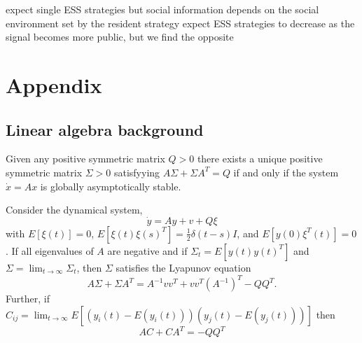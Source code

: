 \documentclass{article}
\begin{document}
expect single ESS strategies but social information depends on the social environment set by the resident strategy
expect ESS strategies to decrease as the signal becomes more public, but we find the opposite

\newpage
\section{Appendix}
\subsection{Linear algebra background }

\begin{theorem} \label{lyapeq_theorem}
Given any positive symmetric matrix $Q>0$ there exists a unique positive symmetric matrix $\Sigma>0$ satisfyying $A\Sigma+\Sigma A^T=Q$ if and only if the system $\dot{x}=Ax$ is globally asymptotically stable.
\end{theorem}

\begin{claim} \label{lyapeq_derivation}
Consider the dynamical system,
\begin{equation}
\dot{y}=Ay+v+Q\xi  \label{tofindsigma}
\end{equation}
with $E[\xi(t)]=0$, $E[\xi(t)\xi(s)^T]=\frac{1}{2}\delta(t-s)I$, and $E[y(0)\xi^T(t)]=0$. If all eigenvalues of $A$ are negative and if $\Sigma_t=E[y(t)y(t)^T]$ and $\Sigma=\lim_{t\to\infty}\Sigma_t$, then $\Sigma$ satisfies the Lyapunov equation
\begin{equation*}
A\Sigma+\Sigma A^T=A^{-1}vv^T+vv^T(A^{-1})^T-QQ^T.
\end{equation*}
Further, if $C_{ij}=\lim_{t\to\infty} E[(y_i(t)-E(y_i(t)))(y_j(t)-E(y_j(t)))]$ then 
\begin{equation*}
AC+CA^T=-QQ^T
\end{equation*}
\end{claim}
\end{document}

